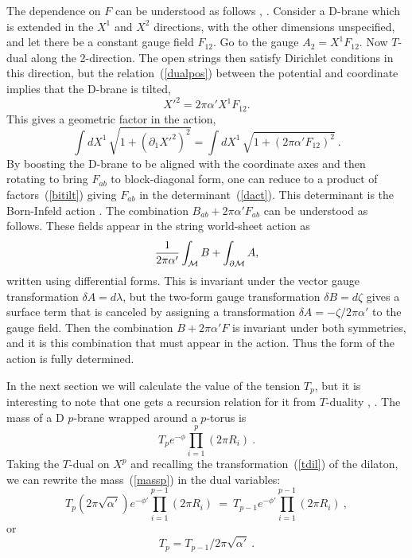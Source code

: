 \documentclass[12pt]{article}
\def\be{\begin{equation}}
\def\ee{\end{equation}}
\def\ap{\alpha'}
\begin{document}
The dependence on $F$ can be understood as
follows \cite{bachas}, \cite{tdbi}. Consider a D-brane which is
extended in the $X^1$ and $X^2$ directions, with the other dimensions
unspecified, and let there be a constant gauge field
$F_{12}$. Go to the gauge $A_2 =X^1 F_{12}$.  Now $T$-dual along the
2-direction.  The open strings then satisfy Dirichlet conditions in this
direction, but the relation~(\ref{dualpos}) between the potential
and coordinate implies that the D-brane is tilted,
\be
X'^2 = 2\pi\ap X^1 F_{12}.
\ee
This gives a geometric factor in the action,
\be
\int dX^1\, \sqrt{1 + (\partial_1 X'^2)^2} = \int dX^1\, \sqrt{1 + (2\pi
\ap F_{12})^2}\ . \label{bitilt}
\ee
By boosting the D-brane to be aligned with the coordinate axes and then
rotating to bring $F_{ab}$ to block-diagonal form, one can reduce to a
product of factors~(\ref{bitilt}) giving $F_{ab}$ in the
determinant~(\ref{dact}). This determinant is the Born-Infeld
action \cite{frad}. The combination $B_{ab} + 2\pi\ap F_{ab}$ can be
understood as follows. These fields appear in the {string} world-sheet
action as
\be
\frac{1}{2\pi\ap} \int_{\cal M} B + \int_{\partial\cal M} A,
\ee
written using differential forms. This is invariant under the vector gauge
transformation $\delta A = d\lambda$, but the two-form gauge
transformation $\delta B = d\zeta$ gives a surface term that is canceled
by assigning a transformation $\delta A = -\zeta/2\pi\ap$ to the gauge
field.  Then the combination $B + 2\pi \ap F$ is invariant under both
symmetries, and it is this combination that must appear in the action.
Thus the form of the action is fully determined.

In the next section we will calculate the value of the tension $T_p$,
but it is interesting to note that one gets a recursion relation for it
from $T$-duality \cite{tdtp}, \cite{shanta}. The mass of a D $p$-brane
wrapped around a
$p$-torus is 
\be
T_p e^{-\phi} \prod_{i=1}^p (2\pi R_i)\ .\label{massp}
\ee  
Taking the $T$-dual on $X^p$ and recalling the
transformation~(\ref{tdil}) of the dilaton, we can rewrite the
mass~(\ref{massp}) in the dual variables:
\be
T_p (2\pi\sqrt{{\ap}}) e^{-\phi'} \prod_{i=1}^{p-1} (2\pi R_i)
\ =\ T_{p-1} e^{-\phi'} \prod_{i=1}^{p-1} (2\pi R_i)\ , 
\ee
or
\be
T_p = T_{p-1}/2\pi\sqrt{{\ap}}\ . \label{trec}
\ee 
\end{document}
